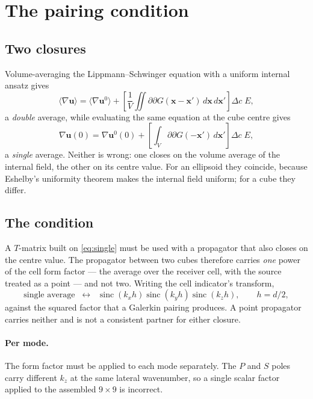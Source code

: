 \documentclass[11pt,a4paper]{article}
\newcommand{\bu}{\mathbf{u}}
\newcommand{\bx}{\mathbf{x}}
\begin{document}
\section{The pairing condition}\label{sec:pairing}

\subsection{Two closures}

Volume-averaging the Lippmann--Schwinger equation with a uniform internal
ansatz gives
\begin{equation}\label{eq:double}
  \langle\nabla\bu\rangle = \langle\nabla\bu^0\rangle
   + \left[\frac{1}{V}\iint \partial\partial G(\bx-\bx')\,d\bx\,d\bx'\right]\Delta c\;E,
\end{equation}
a \emph{double} average, while evaluating the same equation at the cube centre
gives
\begin{equation}\label{eq:single}
  \nabla\bu(0) = \nabla\bu^0(0)
   + \left[\int_V \partial\partial G(-\bx')\,d\bx'\right]\Delta c\;E,
\end{equation}
a \emph{single} average.  Neither is wrong: one closes on the volume average of
the internal field, the other on its centre value.  For an ellipsoid they
coincide, because Eshelby's uniformity theorem makes the internal field
uniform; for a cube they differ.

\subsection{The condition}

A $T$-matrix built on \eqref{eq:single} must be used with a propagator that
also closes on the centre value.  The propagator between two cubes therefore
carries \emph{one} power of the cell form factor --- the average over the
receiver cell, with the source treated as a point --- and not two.  Writing the
cell indicator's transform,
\begin{equation}\label{eq:formfactor}
  \text{single average}\;\;\longleftrightarrow\;\;
    \operatorname{sinc}(k_xh)\operatorname{sinc}(k_yh)\operatorname{sinc}(k_zh),
  \qquad h = d/2,
\end{equation}
against the squared factor that a Galerkin pairing produces.  A point
propagator carries neither and is not a consistent partner for either closure.

\paragraph{Per mode.}  The form factor must be applied to each mode separately.
The $P$ and $S$ poles carry different $k_z$ at the same lateral wavenumber, so
a single scalar factor applied to the assembled $9\times9$ is incorrect.
\end{document}
